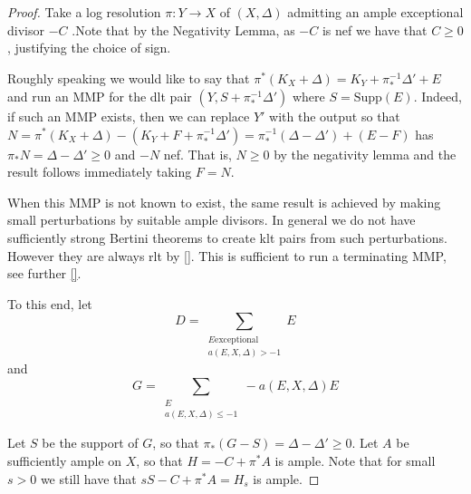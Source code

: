 \documentclass[a4paper,12pt]{book}
\begin{document}
\begin{proof}
	
	
	Take a log resolution $\pi:Y \to X$ of $(X,\Delta)$ admitting an ample exceptional divisor $-C$ \cite{}.Note that by the Negativity Lemma, as $-C$ is nef we have that $C \geq 0$, justifying the choice of sign.
	
	Roughly speaking we would like to say that $\pi^{*}(K_{X}+\Delta)=K_{Y}+\pi_{*}^{-1}\Delta'+E$ and run an MMP for the dlt pair $(Y,S+\pi_{*}^{-1}\Delta')$ where $S=\text{Supp}(E)$. Indeed, if such an MMP exists, then we can replace $Y'$ with the output so that $N=\pi^{*}(K_{X}+\Delta)-(K_{Y}+F+\pi_{*}^{-1}\Delta')= \pi_{*}^{-1}(\Delta-\Delta')+(E-F)$ has $\pi_{*}N=\Delta-\Delta' \geq 0$ and $-N$ nef. That is, $N \geq 0$ by the negativity lemma and the result follows immediately taking $F=N$.  
	
	When this MMP is not known to exist, the same result is achieved by making small perturbations by suitable ample divisors. In general we do not have sufficiently strong Bertini theorems to create klt pairs from such perturbations. However they are always rlt by \autoref{}. This is sufficient to run a terminating MMP, see further \autoref{}.
	
	To this end, let \[D= \sum_{\substack{E \text{exceptional} \\ a(E,X,\Delta) > -1}} E\]
	and 
		\[G = \sum_{\substack{E \\ a(E,X,\Delta) \leq  -1}} -a(E,X,\Delta)E\]
		
	Let $S$ be the support of $G$, so that $\pi_{*}(G-S)=\Delta-\Delta' \geq 0.$ Let $A$ be sufficiently ample on $X$, so that $H=-C+\pi^{*}A$ is ample. Note that for small $s > 0$ we still have that $sS -C+\pi^{*}A=H_{s}$ is ample.
	

\end{proof}
\end{document}
